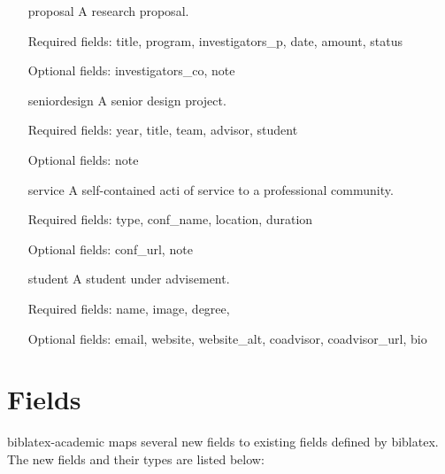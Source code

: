 \documentclass[11pt,letterpaper]{article}
\newcommand{\pkg}[1]{\textsf{#1}}
\newcommand{\entry}[1]{\textsf{#1}}
\newcommand{\field}[1]{\textsf{#1}}
\begin{document}
\begin{itemize}
  \item[\entry{proposal}] A research proposal.

    Required fields:
    \field{title},
    \field{program},
    \field{investigators\_p},
    \field{date},
    \field{amount},
    \field{status}

    Optional fields:
    \field{investigators\_co},
    \field{note}

  \item[\entry{seniordesign}] A senior design project.

    Required fields:
    \field{year},
    \field{title},
    \field{team},
    \field{advisor},
    \field{student}

    Optional fields:
    \field{note}

  \item[\entry{service}] A self-contained acti of service to a professional community.

    Required fields:
    \field{type},
    \field{conf\_name},
    \field{location},
    \field{duration}

    Optional fields:
    \field{conf\_url},
    \field{note}

  \item[\entry{student}] A student under advisement.

    Required fields:
    \field{name},
    \field{image},
    \field{degree},

    Optional fields:
    \field{email},
    \field{website},
    \field{website\_alt},
    \field{coadvisor},
    \field{coadvisor\_url},
    \field{bio}
\end{itemize}


\section{Fields}\label{sec:fields}

\pkg{biblatex-academic} maps several new fields to existing fields defined by \pkg{biblatex}.
The new fields and their types are listed below:
\end{document}
